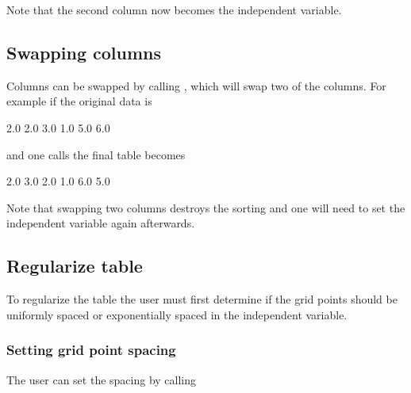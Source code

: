 \documentclass[letterpaper,10pt,english]{sphinxmanual}
\begin{document}
Note that the second column now becomes the independent variable.


\subsection{Swapping columns}
\label{\detokenize{Utilities/LookupTable:swapping-columns}}
Columns can be swapped by calling , which will swap two of the columns.
For example if the original data is

\begin{sphinxVerbatim}[commandchars=\\\{\},formatcom=\scriptsize]
2.0  2.0  3.0
1.0  5.0  6.0
\end{sphinxVerbatim}

and one calls  the final table becomes

\begin{sphinxVerbatim}[commandchars=\\\{\},formatcom=\scriptsize]
2.0  3.0  2.0
1.0  6.0  5.0
\end{sphinxVerbatim}

Note that swapping two columns destroys the sorting and one will need to set the independent variable again afterwards.


\subsection{Regularize table}
\label{\detokenize{Utilities/LookupTable:regularize-table}}
To regularize the table the user must first determine if the grid points should be uniformly spaced or exponentially spaced in the independent variable.


\subsubsection{Setting grid point spacing}
\label{\detokenize{Utilities/LookupTable:setting-grid-point-spacing}}
The user can set the spacing by calling

\begin{sphinxVerbatim}[commandchars=\\\{\},formatcom=\scriptsize]
   
\end{sphinxVerbatim}
\end{document}
